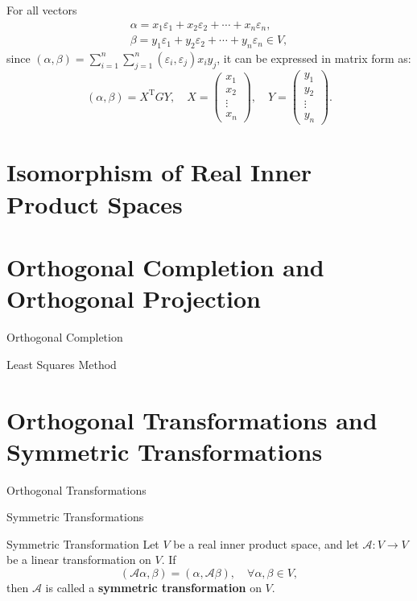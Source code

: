 \documentclass[11pt]{../../TexTemplate/elegantbook} %
\begin{document}
For all vectors
\begin{gather*}
    \alpha = x_{1}\varepsilon_{1}+x_{2}\varepsilon_{2}+\cdots+x_{n}\varepsilon_{n},  \\
    \beta = y_{1}\varepsilon_{1}+y_{2}\varepsilon_{2}+\cdots+y_{n}\varepsilon_{n} \in V ,
\end{gather*}
since \(( \alpha, \beta)=\sum_{i=1}^{n} \sum_{j=1}^{n}  (\varepsilon_i, \varepsilon_j)x_{i}y_{j} \), 
it can be expressed in matrix form as:
\[
( \alpha, \beta) = X^{\mathrm{T}} G Y, \quad
X = \begin{pmatrix} x_1 \\ x_2 \\ \vdots \\ x_n \end{pmatrix}, \quad
Y = \begin{pmatrix} y_1 \\ y_2 \\ \vdots \\ y_n \end{pmatrix}.
\]


\section{Isomorphism of Real Inner Product Spaces}

\section{Orthogonal Completion and Orthogonal Projection}
\begin{leftbarTitle}{Orthogonal Completion}\end{leftbarTitle}

\begin{leftbarTitle}{Least Squares Method}\end{leftbarTitle}


\section{Orthogonal Transformations and Symmetric Transformations}
\begin{leftbarTitle}{Orthogonal Transformations}\end{leftbarTitle}
\begin{leftbarTitle}{Symmetric Transformations}\end{leftbarTitle}
\begin{definition}{Symmetric Transformation}
    Let \( V \) be a real inner product space, 
    and let \( \mathcal{A}: V \to V \) be a linear transformation on \( V \).
    If
    \[
    (\mathcal{A}\alpha, \beta) = (\alpha, \mathcal{A}\beta), \quad \forall \alpha, \beta \in V,
    \]
    then \( \mathcal{A} \) is called a \textbf{symmetric transformation} on \( V \).
\end{definition}
\end{document}
